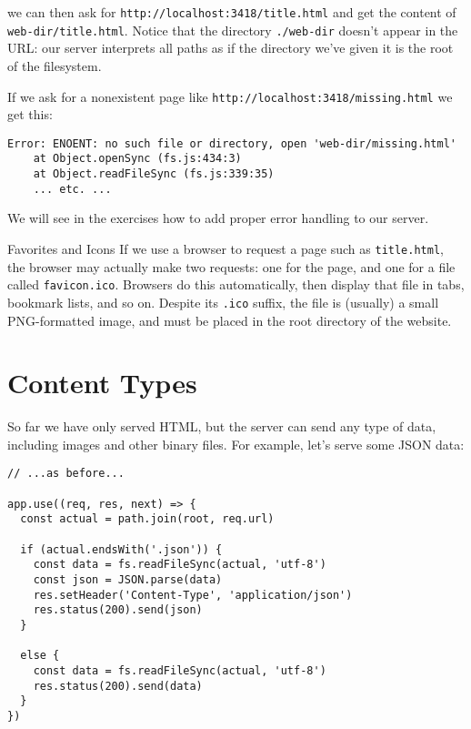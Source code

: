 \noindent
we can then ask for \texttt{http://localhost:3418/title.html}
and get the content of \texttt{web-dir/title.html}.
Notice that the directory \texttt{./web-dir} doesn't appear in the URL:
our server interprets all paths as if the directory we've given it
is the root of the filesystem.

If we ask for a nonexistent page like \texttt{http://localhost:3418/missing.html}
we get this:

\begin{verbatim}
Error: ENOENT: no such file or directory, open 'web-dir/missing.html'
    at Object.openSync (fs.js:434:3)
    at Object.readFileSync (fs.js:339:35)
    ... etc. ...
\end{verbatim}

We will see in the exercises how to add proper error handling to our server.

\begin{aside}{Favorites and Icons}
  If we use a browser to request a page such as \texttt{title.html},
  the browser may actually make two requests:
  one for the page,
  and one for a file called \texttt{favicon.ico}.
  Browsers do this automatically,
  then display that file in tabs, bookmark lists, and so on.
  Despite its \texttt{.ico} suffix,
  the file is (usually) a small PNG-formatted image,
  and must be placed in the root directory of the website.
\end{aside}

\section{Content Types}\label{s:server-content-types}

So far we have only served HTML,
but the server can send any type of data,
including images and other binary files.
For example,
let's serve some JSON data:

\begin{verbatim}
// ...as before...

app.use((req, res, next) => {
  const actual = path.join(root, req.url)

  if (actual.endsWith('.json')) {
    const data = fs.readFileSync(actual, 'utf-8')
    const json = JSON.parse(data)
    res.setHeader('Content-Type', 'application/json')
    res.status(200).send(json)
  }

  else {
    const data = fs.readFileSync(actual, 'utf-8')
    res.status(200).send(data)
  }
})
\end{verbatim}

